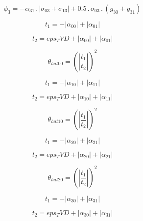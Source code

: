 \documentclass{article}
\begin{document}
\begin{dmath}\phi_{3} = - \alpha_{31} \,.\, \left|{\sigma_{0 3} + \sigma_{1 3}}\right| + 0.5 \,.\, \sigma_{0 3} \,.\, \left(g_{30} + g_{31}\right)\end{dmath}

\begin{dmath}t_{1} = - \left|{\alpha_{00}}\right| + \left|{\alpha_{01}}\right|\end{dmath}

\begin{dmath}t_{2} = eps_TVD + \left|{\alpha_{00}}\right| + \left|{\alpha_{01}}\right|\end{dmath}

\begin{dmath}\theta_{hat 00} = \left(\left|{\frac{t_{1}}{t_{2}}}\right| \right)^{2}\end{dmath}

\begin{dmath}t_{1} = - \left|{\alpha_{10}}\right| + \left|{\alpha_{11}}\right|\end{dmath}

\begin{dmath}t_{2} = eps_TVD + \left|{\alpha_{10}}\right| + \left|{\alpha_{11}}\right|\end{dmath}

\begin{dmath}\theta_{hat 10} = \left(\left|{\frac{t_{1}}{t_{2}}}\right| \right)^{2}\end{dmath}

\begin{dmath}t_{1} = - \left|{\alpha_{20}}\right| + \left|{\alpha_{21}}\right|\end{dmath}

\begin{dmath}t_{2} = eps_TVD + \left|{\alpha_{20}}\right| + \left|{\alpha_{21}}\right|\end{dmath}

\begin{dmath}\theta_{hat 20} = \left(\left|{\frac{t_{1}}{t_{2}}}\right| \right)^{2}\end{dmath}

\begin{dmath}t_{1} = - \left|{\alpha_{30}}\right| + \left|{\alpha_{31}}\right|\end{dmath}

\begin{dmath}t_{2} = eps_TVD + \left|{\alpha_{30}}\right| + \left|{\alpha_{31}}\right|\end{dmath}
\end{document}
